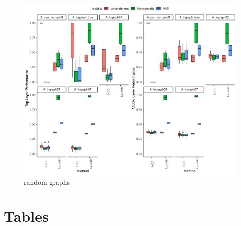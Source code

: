 \documentclass[
]{article}
\begin{document}
\begin{figure}
\centering
\includegraphics{Lab_report_3_13_2024_files/figure-latex/unnamed-chunk-5-1.pdf}
\caption{random graphs}
\end{figure}

\newpage 
\section*{Tables}
\end{document}
